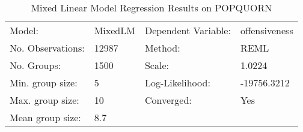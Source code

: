 \begin{table}
\caption{Mixed Linear Model Regression Results on POPQUORN}
\label{}
\begin{center}
\begin{tabular}{llll}
\hline
Model:            & MixedLM & Dependent Variable: & offensiveness  \\
No. Observations: & 12987   & Method:             & REML           \\
No. Groups:       & 1500    & Scale:              & 1.0224         \\
Min. group size:  & 5       & Log-Likelihood:     & -19756.3212    \\
Max. group size:  & 10      & Converged:          & Yes            \\
Mean group size:  & 8.7     &                     &                \\
\hline
\end{tabular}
\end{center}


\end{table}
